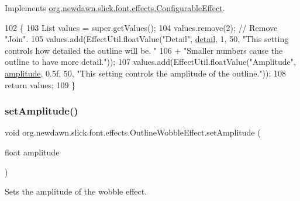 Implements \mbox{\hyperlink{interfaceorg_1_1newdawn_1_1slick_1_1font_1_1effects_1_1_configurable_effect_ac4ea8fedf0f9d7ca7ffe1bd5543d78cb}{org.\+newdawn.\+slick.\+font.\+effects.\+Configurable\+Effect}}.


\begin{DoxyCode}
102                             \{
103         List values = super.getValues();
104         values.remove(2); \textcolor{comment}{// Remove "Join".}
105         values.add(EffectUtil.floatValue(\textcolor{stringliteral}{"Detail"}, \mbox{\hyperlink{classorg_1_1newdawn_1_1slick_1_1font_1_1effects_1_1_outline_wobble_effect_ac43d2a2c878ac5034bf82a0837cfa86f}{detail}}, 1, 50, \textcolor{stringliteral}{"This setting controls how detailed
       the outline will be. "}
106             + \textcolor{stringliteral}{"Smaller numbers cause the outline to have more detail."}));
107         values.add(EffectUtil.floatValue(\textcolor{stringliteral}{"Amplitude"}, \mbox{\hyperlink{classorg_1_1newdawn_1_1slick_1_1font_1_1effects_1_1_outline_wobble_effect_a6797d66a3cfb14ca9b2e04bad9f2979e}{amplitude}}, 0.5f, 50, \textcolor{stringliteral}{"This setting controls
       the amplitude of the outline."}));
108         \textcolor{keywordflow}{return} values;
109     \}
\end{DoxyCode}
\mbox{\label{classorg_1_1newdawn_1_1slick_1_1font_1_1effects_1_1_outline_wobble_effect_adb089f2f7009fc39fd5b76465cb99899}} 
\subsubsection{\texorpdfstring{set\+Amplitude()}{setAmplitude()}}
{\footnotesize\ttfamily void org.\+newdawn.\+slick.\+font.\+effects.\+Outline\+Wobble\+Effect.\+set\+Amplitude (\begin{DoxyParamCaption}\item[{float}]{amplitude }\end{DoxyParamCaption})\hspace{0.3cm}{\ttfamily [inline]}}

Sets the amplitude of the wobble effect.


